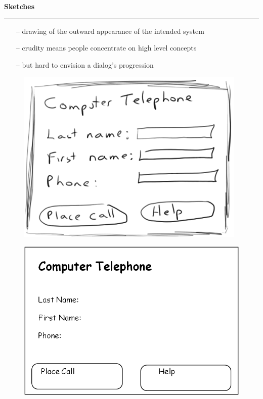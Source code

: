 \documentclass[pdf]{beamer}
\begin{document}
\begin{frame}
\vspace{8mm}
\textcolor{myBlue}{\textbf{\Large{Sketches}}}

\textcolor{red}{\rule{10cm}{1mm}}

\bigskip

\begin{itemize}
    \item[\textcolor{black}{--}] drawing of the outward appearance of the intended system
    \item[\textcolor{black}{--}] crudity means people concentrate on high level concepts
    \item[\textcolor{black}{--}] but hard to envision a dialog’s progression

\end{itemize}

\bigskip

\begin{minipage}{0.49\textwidth}
\begin{figure}[b]
   	\includegraphics[scale = 0.45]{15a.PNG}
\end{figure}
\end{minipage}
\begin{minipage}{0.49\textwidth}
\begin{figure}[b]
   	\includegraphics[scale = 0.45]{15b.PNG}
\end{figure}
\end{minipage}

\end{frame}
\end{document}
